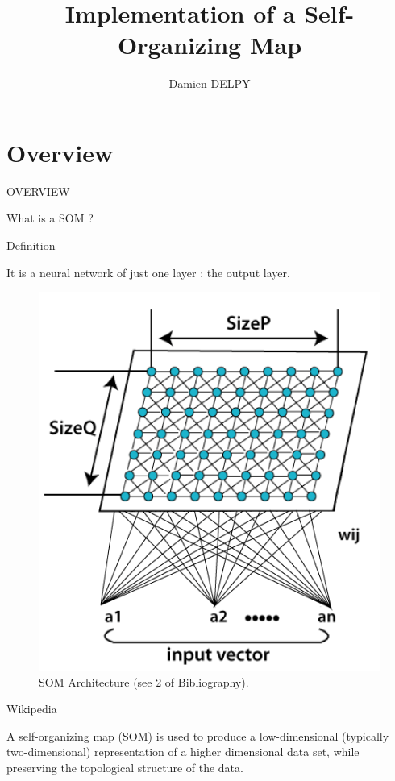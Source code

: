 \documentclass{beamer}
\author{Damien DELPY}
\title{Implementation of a Self-Organizing Map}
\institute{ENSEIRB-MATMECA}
\begin{document}
\begin{frame}
	
	\titlepage
\end{frame}


\begin{frame}

	\tableofcontents[sectionstyle=show,subsectionstyle=show/shaded/hide,subsectionstyle=show/shaded/hide]
\end{frame}

	

\section{Overview}
	
	\begin{frame}

		\begin{center}
			
			\Huge OVERVIEW
		\end{center}
	\end{frame}


	\begin{frame}{What is a SOM ?}
		
		\begin{block}{Definition}
 
It is a neural network of just one layer : the output layer.
 	
			
		\begin{center}
			
			\begin{figure}[h]
			
				\includegraphics[width=0.3\linewidth]{pics/som_example_diapo_1.png}
				\caption{SOM Architecture (see 2 of Bibliography).}
			\end{figure}
		\end{center}

		\end{block}		

		\begin{block}{Wikipedia}

A self-organizing map (SOM) is used to produce a low-dimensional (typically two-dimensional) representation of a higher dimensional data set, while preserving the topological structure of the data. 
		\end{block}
	\end{frame}
	
\end{document}
